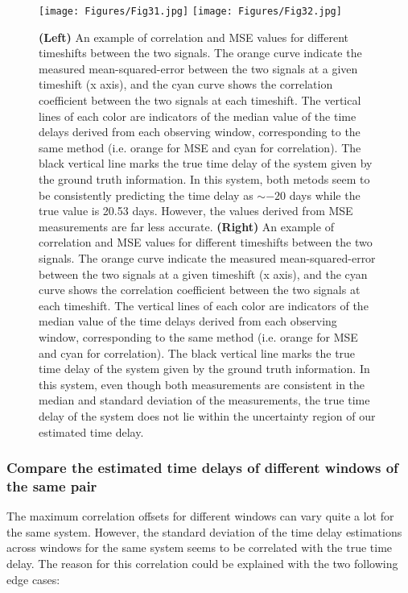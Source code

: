 \documentclass[a4paper, 11pt]{article}
\begin{document}
\begin{figure}
\centering
\texttt{[image: Figures/Fig31.jpg]}
\texttt{[image: Figures/Fig32.jpg]}
\caption{{\bf (Left) }An example of correlation and MSE values for different timeshifts between the two signals. The orange curve indicate the measured mean-squared-error between the two signals at a given timeshift (x axis), and the cyan curve shows the correlation coefficient between the two signals at each timeshift. The vertical lines of each color are indicators of the median value of the time delays derived from each observing window, corresponding to the same method (i.e. orange for MSE and cyan for correlation). The black vertical line marks the true time delay of the system given by the ground truth information. In this system, both metods seem to be consistently predicting the time delay as $\sim -20$ days while the true value is 20.53 days. However, the values derived from MSE measurements are far less accurate. {\bf (Right) }An example of correlation and MSE values for different timeshifts between the two signals. The orange curve indicate the measured mean-squared-error between the two signals at a given timeshift (x axis), and the cyan curve shows the correlation coefficient between the two signals at each timeshift. The vertical lines of each color are indicators of the median value of the time delays derived from each observing window, corresponding to the same method (i.e. orange for MSE and cyan for correlation). The black vertical line marks the true time delay of the system given by the ground truth information. In this system, even though both measurements are consistent in the median and standard deviation of the measurements, the true time delay of the system does not lie within the uncertainty region of our estimated time delay.}
\label{fig:Fig3}
\end{figure}

\subsubsection{Compare the estimated time delays of different windows of the same pair}
The maximum correlation offsets for different windows can vary quite a lot for the same system. However, the standard deviation of the time delay estimations across windows for the same system seems to be correlated with the true time delay. The reason for this correlation could be explained with the two following edge cases:
\end{document}

